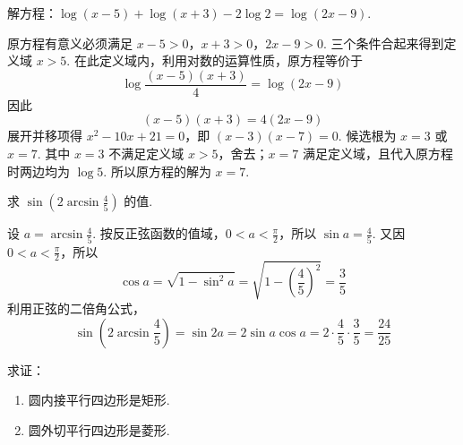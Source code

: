 \documentclass[UTF8,a4paper,oneside,11pt]{ctexbook}
\begin{document}
\begin{problem}
解方程：\(\log\left(x-5\right)+\log\left(x+3\right)-2\log2=\log\left(2x-9\right)\).
\end{problem}

\begin{solution}
原方程有意义必须满足 \(x-5>0\)，\(x+3>0\)，\(2x-9>0\).
三个条件合起来得到定义域 \(x>5\). 在此定义域内，利用对数的运算性质，原方程等价于
\[
\log\frac{\left(x-5\right)\left(x+3\right)}{4}=\log\left(2x-9\right)
\]
因此
\[
\left(x-5\right)\left(x+3\right)=4\left(2x-9\right)
\]
展开并移项得 \(x^2-10x+21=0\)，即 \(\left(x-3\right)\left(x-7\right)=0\).
候选根为 \(x=3\) 或 \(x=7\). 其中 \(x=3\) 不满足定义域 \(x>5\)，舍去；\(x=7\) 满足定义域，且代入原方程时两边均为 \(\log5\). 所以原方程的解为 \(x=7\).
\end{solution}

\begin{problem}
求 \(\sin\left(2\arcsin\frac45\right)\) 的值.
\end{problem}

\begin{solution}
设 \(a=\arcsin\frac45\). 按反正弦函数的值域，\(0<a<\frac{\pi}{2}\)，所以
\(\sin a=\frac45\). 又因 \(0<a<\frac{\pi}{2}\)，所以
\[
\cos a=\sqrt{1-\sin^2a}=\sqrt{1-\left(\frac45\right)^2}=\frac35
\]
利用正弦的二倍角公式，
\[
\sin\left(2\arcsin\frac45\right)=\sin2a=2\sin a\cos a=2\cdot\frac45\cdot\frac35=\frac{24}{25}
\]
\end{solution}

\begin{problem}
求证：

\begin{enumerate}
\item 圆内接平行四边形是矩形.
\item 圆外切平行四边形是菱形.
\end{enumerate}
\end{problem}
\end{document}

